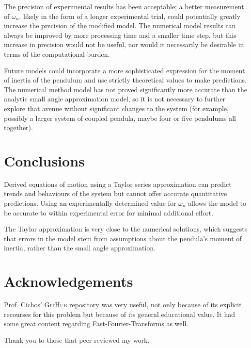 \documentclass[aps,prl,reprint,10pt,amsmath,amssymb,superscriptaddress,a4paper, floatfix]{revtex4-2}
\begin{document}
The precision of experimental results has been acceptable; a better measurement of $\omega_n$, likely in the form of a longer experimental trial, could potentially greatly increase the precision of the modified model. The numerical model results can always be improved by more processing time and a smaller time step, but this increase in precision would not be useful, nor would it necessarily be desirable in terms of the computational burden.

Future models could incorporate a more sophisticated expression for the moment of inertia of the pendulum and use strictly theoretical values to make predictions. The numerical method model has not proved significantly more accurate than the analytic small angle approximation model, so it is not necessary to further explore that avenue without significant changes to the system (for example, possibly a larger system of coupled pendula, maybe four or five pendulums all together). 

\pagebreak

\section{Conclusions}

Derived equations of motion using a Taylor series approximation can predict trends and behaviours of the system but cannot offer accurate quantitative predictions. Using an experimentally determined value for $\omega_n$ allows the model to be accurate to within experimental error for minimal additional effort.

The Taylor approximation is very close to the numerical solutions, which suggests that errors in the model stem from assumptions about the pendula's moment of inertia, rather than the small angle approximation.

\section{Acknowledgements}

Prof. Cichos' \textsc{GitHub} repository \cite{GitHub} was very useful, not only because of its explicit recourses for this problem but because of its general educational value. It had some great content regarding Fast-Fourier-Transforms as well.

\vspace*{6pt}

Thank you to those that peer-reviewed my work.

\vspace*{6pt}
\end{document}
